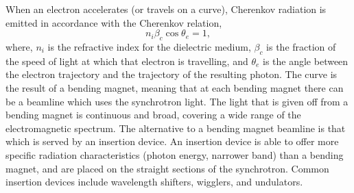 When an electron accelerates (or travels on a curve), Cherenkov radiation is emitted in accordance with the Cherenkov relation,
%
\begin{equation}
    n_i\beta_c\cos{\theta_e} = 1,
\end{equation}
%
where, $n_i$ is the refractive index for the dielectric medium, $\beta_c$ is the fraction of the speed of light at which that electron is travelling, and $\theta_e$ is the angle between the electron trajectory and the trajectory of the resulting photon.
The curve is the result of a bending magnet, meaning that at each bending magnet there can be a beamline which uses the synchrotron light.
The light that is given off from a bending magnet is continuous and broad, covering a wide range of the electromagnetic spectrum.
The alternative to a bending magnet beamline is that which is served by an insertion device.
An insertion device is able to offer more specific radiation characteristics (photon energy, narrower band) than a bending magnet, and are placed on the straight sections of the synchrotron.
Common insertion devices include wavelength shifters, wigglers, and undulators.

